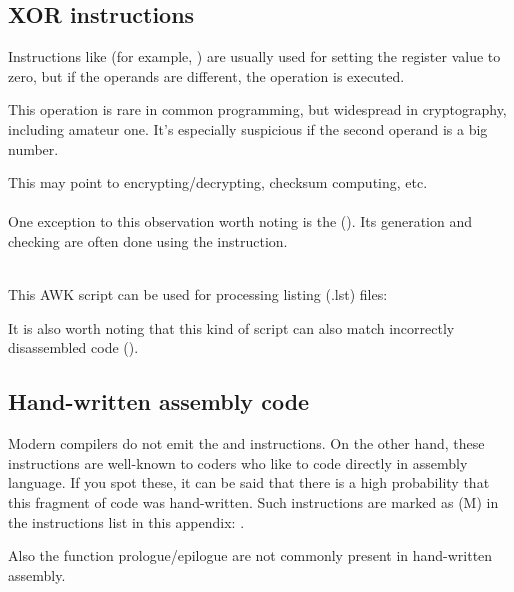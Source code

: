 
\subsection{XOR instructions}

Instructions like  (for example, ) 
are usually used for setting the register value
to zero, but if the operands are different, the  operation
is executed.

This operation is rare in common programming, but widespread in cryptography,
including amateur one.
It's especially suspicious if the
second operand is a big number.

This may point to encrypting/decrypting, checksum computing, etc.\\
\\

One exception to this observation worth noting is the  (). 
Its generation and checking are often done using the \XOR instruction. \\
\\

This AWK script can be used for processing \IDA{} listing (.lst) files:



It is also worth noting that this kind of script can also match incorrectly disassembled code 
().

\subsection{Hand-written assembly code}


Modern compilers do not emit the  and  instructions.
On the other hand, these instructions are well-known to coders who like to code directly in assembly language.
If you spot these, it can be said that there is a high probability that this fragment of code was hand-written.
Such instructions are marked as (M) in the instructions list in this appendix: .

\par
Also the function prologue/epilogue are not commonly present in hand-written assembly.

